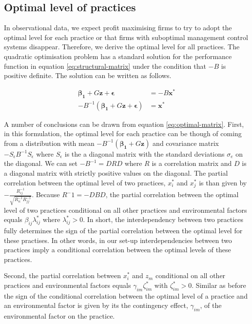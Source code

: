 \documentclass[12pt]{article}
\begin{document}
\subsection{Optimal level of practices}\label{optimal-practices}

In observational data, we expect profit maximising firms to try to adopt the optimal level for each practice or that firms with suboptimal management control systems disappear. Therefore, we derive the optimal level for all practices. The quadratic optimisation problem has a standard solution for the performance function in equation \eqref{eq:structural-matrix} under the condition that $-B$ is positive definite. The solution can be written as follows.

\begin{equation} \label{eq:optimal-matrix}
\begin{aligned} 
    \mathbf{\beta_1} + G \mathbf{z} + \mathbf{\epsilon} & = -B \mathbf{x^*} \\
    - B^{-1} (\mathbf{\beta_1} +  G \mathbf{z} + \mathbf{\epsilon})  & = \mathbf{x^*}
\end{aligned}
\end{equation}

A number of conclusions can be drawn from equation \eqref{eq:optimal-matrix}. First, in this formulation, the optimal level for each practice can be though of coming from a distribution with mean $-B^{-1} (\mathbf{\beta_1} + G \mathbf{z})$ and covariance matrix $-S_{\epsilon} B^{-1} S_{\epsilon}$ where $S_{\epsilon}$ is the a diagonal matrix with the standard deviations $\sigma_e$ on the diagonal. We can set $-B^{-1} = DRD$ where $R$ is a correlation matrix and $D$ is a diagonal matrix with strictly positive values on the diagonal. The partial correlation between the optimal level of two practices, $x^*_i$ and $x^*_j$ is than given by $-\frac{R^{-1}_{ij}}{\sqrt{R^{-1}_{ii} R^{-1}_{jj}}}$. Because $R^-1 = - DBD$, the partial correlation between the optimal level of two practices conditional on all other practices and environmental factors equals $\beta_{ij}\lambda_{ij}^*$ where $\lambda_{ij}^* > 0$. In short, the interdependency between two practices fully determines the sign of the partial correlation between the optimal level for these practises. In other words, in our set-up interdependencies between two practices imply a conditional correlation between the optimal levels of these practices. 

Second, the partial correlation between $x^*_i$ and $z_m$ conditional on all other practices and environmental factors equals $\gamma_{im} \zeta_{im}^*$ with $\zeta_{im}^* > 0$. Similar as before the sign of the conditional correlation between the optimal level of a practice and an environmental factor is given by its the contingency effect, $\gamma_{im}$, of the environmental factor on the practice. 
\end{document}
